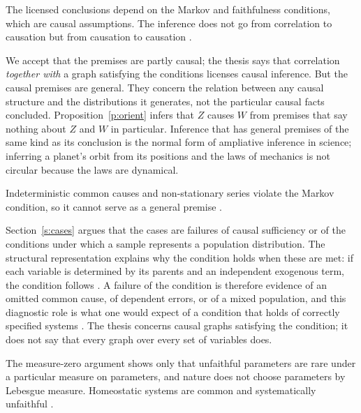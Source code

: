 \documentclass{situationist-preprint}
\begin{document}
\begin{objection}\label{o:circular}
The licensed conclusions depend on the Markov and faithfulness conditions, which are causal assumptions. The inference does not go from correlation to causation but from causation to causation \citep{Cartwright1989}.
\end{objection}

\begin{reply}
We accept that the premises are partly causal; the thesis says that correlation \emph{together with} a graph satisfying the conditions licenses causal inference. But the causal premises are general. They concern the relation between any causal structure and the distributions it generates, not the particular causal facts concluded. Proposition~\ref{p:orient} infers that $Z$ causes $W$ from premises that say nothing about $Z$ and $W$ in particular. Inference that has general premises of the same kind as its conclusion is the normal form of ampliative inference in science; inferring a planet's orbit from its positions and the laws of mechanics is not circular because the laws are dynamical.
\end{reply}

\begin{objection}
Indeterministic common causes and non-stationary series violate the Markov condition, so it cannot serve as a general premise \citep{Cartwright2007,Sober2001}.
\end{objection}

\begin{reply}
Section~\ref{s:cases} argues that the cases are failures of causal sufficiency or of the conditions under which a sample represents a population distribution. The structural representation explains why the condition holds when these are met: if each variable is determined by its parents and an independent exogenous term, the condition follows \citep{Pearl2009}. A failure of the condition is therefore evidence of an omitted common cause, of dependent errors, or of a mixed population, and this diagnostic role is what one would expect of a condition that holds of correctly specified systems \citep{Hausman1999}. The thesis concerns causal graphs satisfying the condition; it does not say that every graph over every set of variables does.
\end{reply}

\begin{objection}\label{o:faith}
The measure-zero argument shows only that unfaithful parameters are rare under a particular measure on parameters, and nature does not choose parameters by Lebesgue measure. Homeostatic systems are common and systematically unfaithful \citep{Andersen2013}.
\end{objection}
\end{document}
